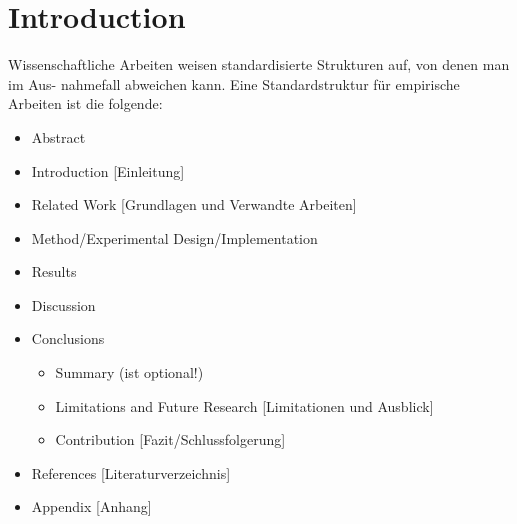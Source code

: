 \section{Introduction} \label{sec:introduction}

Wissenschaftliche Arbeiten weisen standardisierte Strukturen auf, von denen man im Aus- nahmefall abweichen kann. Eine Standardstruktur für empirische Arbeiten ist die folgende:
\begin{itemize}
  \item Abstract
  \item Introduction [Einleitung]
  \item Related Work [Grundlagen und Verwandte Arbeiten]
  \item Method/Experimental Design/Implementation
  \item Results
  \item Discussion
  \item Conclusions
  \begin{itemize}
    \item Summary (ist optional!)
    \item Limitations and Future Research [Limitationen und Ausblick]
     \item Contribution [Fazit/Schlussfolgerung]
   \end{itemize}
   \item References [Literaturverzeichnis]
   \item Appendix [Anhang]
\end{itemize}


